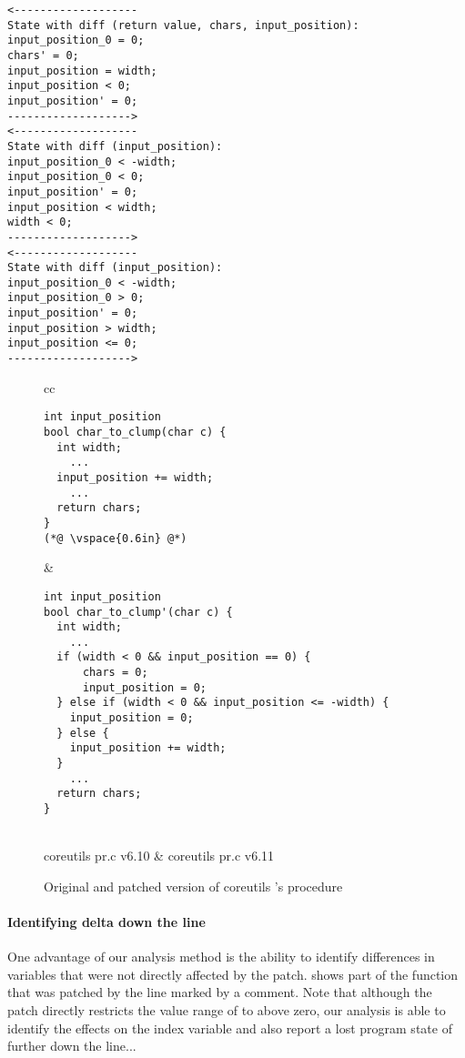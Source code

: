\begin{lstlisting}
<-------------------
State with diff (return value, chars, input_position):
input_position_0 = 0;
chars' = 0;
input_position = width;
input_position < 0;
input_position' = 0;
------------------->
<-------------------
State with diff (input_position):
input_position_0 < -width;
input_position_0 < 0;
input_position' = 0;
input_position < width;
width < 0;
------------------->
<-------------------
State with diff (input_position):
input_position_0 < -width;
input_position_0 > 0;
input_position' = 0;
input_position > width;
input_position <= 0;
------------------->
\end{lstlisting}

\begin{figure*}
\centering
\begin{tabular}{cc}
\begin{lstlisting}
int input_position
bool char_to_clump(char c) {
  int width;
    ...
  input_position += width;
    ...
  return chars;
}
(*@ \vspace{0.6in} @*)
\end{lstlisting}
\hspace{1.0in}
&
\begin{lstlisting}
int input_position
bool char_to_clump'(char c) {
  int width;
    ...
  if (width < 0 && input_position == 0) {
      chars = 0;
      input_position = 0;
  } else if (width < 0 && input_position <= -width) {
    input_position = 0;
  } else {
    input_position += width;
  }
    ...
  return chars;
}
\end{lstlisting}
\\
coreutils pr.c v6.10 & coreutils pr.c v6.11
\end{tabular}
\caption{Original and patched version of coreutils 's  procedure}
\end{figure*}

\paragraph{Identifying delta down the line}
One advantage of our analysis method is the ability to identify differences in variables that were not directly affected by the patch.  shows part of the  function that was patched by the line marked by a comment. Note that although the patch directly restricts the value range of  to above zero, our analysis is able to identify the effects on the index variable  and also report a lost program state of  further down the line...

